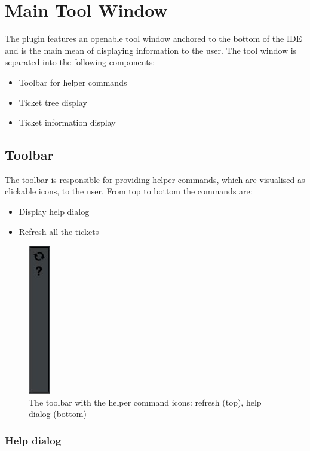 \documentclass{4thYearProject}
\begin{document}
\section{Main Tool Window}

The plugin features an openable tool window anchored to the bottom of the IDE and is the main mean of displaying information to the user. The tool window is separated into the following components: 

\begin{itemize}
\item Toolbar for helper commands
\item Ticket tree display
\item Ticket information display
\end{itemize}

\subsection{Toolbar}\label{sec:toolbar}

The toolbar is responsible for providing helper commands, which are visualised as clickable icons, to the user. \newline
From top to bottom the commands are:
\begin{itemize}
\item Display help dialog
\item Refresh all the tickets
\end{itemize}

\begin{figure}[H]
\includegraphics[scale=0.6]{Toolbar_figure}
\centering
\caption{The toolbar with the helper command icons: refresh (top), help dialog (bottom)}\label{toolbar}
\label{fig:toolbar}
\end{figure}

\subsubsection{Help dialog}
\end{document}

